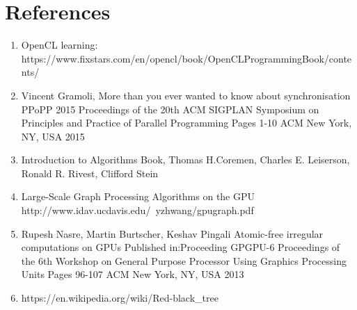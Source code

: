 \documentclass[BTech]{iitmdiss}
\begin{document}
\chapter{References}
\begin{enumerate}  
\item OpenCL learning: \newblock\\
https://www.fixstars.com/en/opencl/book/OpenCLProgrammingBook/contents/
\item Vincent Gramoli, More than you ever wanted to know about synchronisation\\
PPoPP 2015 Proceedings of the 20th ACM SIGPLAN Symposium on Principles and Practice of Parallel Programming
Pages 1-10 
ACM New York, NY, USA 2015 
\item Introduction to Algorithms Book, Thomas H.Coremen, Charles E. Leiserson, Ronald R. Rivest, Clifford Stein
\item Large-Scale Graph Processing Algorithms on the GPU\\
http://www.idav.ucdavis.edu/~yzhwang/gpugraph.pdf
\item Rupesh Nasre, Martin Burtscher, Keshav Pingali Atomic-free irregular computations on GPUs
Published in:Proceeding
GPGPU-6 Proceedings of the 6th Workshop on General Purpose Processor Using Graphics Processing Units
Pages 96-107 
ACM New York, NY, USA 2013 
\item https://en.wikipedia.org/wiki/Red-black\_tree
\end{enumerate}

\appendix
\lstset{style=mystyle}
\end{document}
